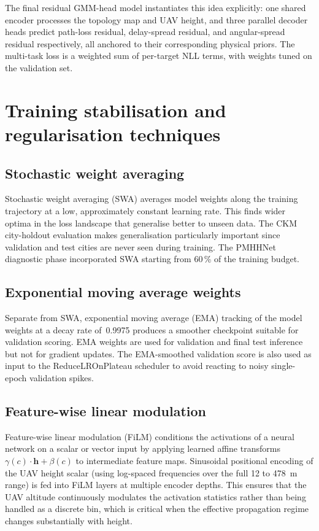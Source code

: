 The final residual GMM-head model instantiates this idea explicitly: one shared encoder processes the
topology map and UAV height, and three parallel decoder heads predict path-loss
residual, delay-spread residual, and angular-spread residual respectively, all
anchored to their corresponding physical priors.  The multi-task loss is a
weighted sum of per-target NLL terms, with weights tuned on the validation set.

\section{Training stabilisation and regularisation techniques}
\label{sec:soa_training}

\subsection{Stochastic weight averaging}

Stochastic weight averaging (SWA) \cite{izmailov2018swa} averages model weights
along the training trajectory at a low, approximately constant learning rate.
This finds wider optima in the loss landscape that generalise better to
unseen data. The CKM city-holdout evaluation makes generalisation particularly
important since validation and test cities are never seen during training.
The PMHHNet diagnostic phase incorporated SWA starting from 60\,\% of the training budget.

\subsection{Exponential moving average weights}

Separate from SWA, exponential moving average (EMA) tracking of the model
weights at a decay rate of~0.9975 produces a smoother checkpoint suitable for
validation scoring.  EMA weights are used for validation and final test inference
but not for gradient updates.  The EMA-smoothed validation score is also used as
input to the ReduceLROnPlateau scheduler to avoid reacting to noisy single-epoch
validation spikes.

\subsection{Feature-wise linear modulation}

Feature-wise linear modulation (FiLM) \cite{perez2018film} conditions
the activations of a neural network on a scalar or vector input by applying
learned affine transforms $\gamma(c) \cdot \textbf{h} + \beta(c)$ to
intermediate feature maps.  Sinusoidal positional encoding of the UAV height
scalar (using log-spaced frequencies over the full 12 to 478~m range) is fed into
FiLM layers at multiple encoder depths.  This ensures that the UAV altitude
continuously modulates the activation statistics rather than being handled as a
discrete bin, which is critical when the effective propagation regime changes
substantially with height.

